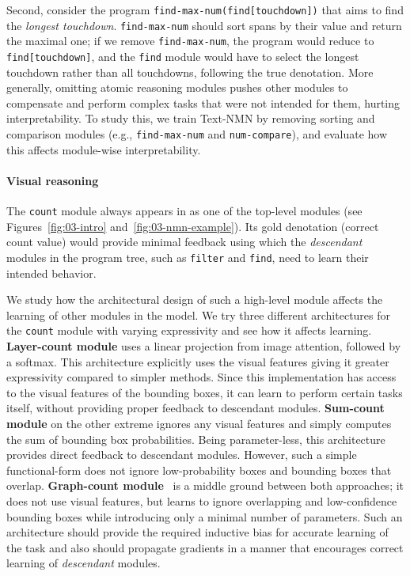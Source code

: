 \documentclass[main.tex]{subfiles}
\begin{document}
Second, consider the program \texttt{find-max-num(find[\textrm{touchdown}])} that aims to find the \textit{longest touchdown}.
\texttt{find-max-num} should sort spans by their value and return the maximal one; if we remove \texttt{find-max-num}, the program would reduce to \texttt{find[\textrm{touchdown}]},
and the \texttt{find} module would have to select the longest touchdown rather than all touchdowns, following the true denotation. More generally, omitting atomic reasoning modules pushes other modules to compensate and perform complex tasks that were not intended for them, hurting interpretability.
To study this, we train Text-NMN by removing sorting and comparison modules (e.g., \texttt{find-max-num} and \texttt{num-compare}), and evaluate how this affects module-wise interpretability.

\paragraph{Visual reasoning}
The \texttt{count} module always appears in \nlvr{} as one of the top-level modules (see Figures~\ref{fig:03-intro} and~\ref{fig:03-nmn-example}).
Its gold denotation (correct count value) would provide minimal feedback using which the \emph{descendant} modules in the program tree, such as \texttt{filter} and \texttt{find}, need to learn their intended behavior.

We study how the architectural design of such a high-level module affects the learning of other modules in the model. We try three different architectures for the \texttt{count} module with varying expressivity and see how it affects learning.
\textbf{Layer-count module} uses a linear projection from image attention, followed by a \textrm{softmax}. This architecture explicitly uses the visual features giving it greater expressivity compared to simpler methods. Since this implementation has access to the visual features of the bounding boxes, it can learn to perform certain tasks itself, without providing proper feedback to descendant modules.
\textbf{Sum-count module} on the other extreme ignores any visual features and simply computes the sum of bounding box probabilities. Being parameter-less, this architecture provides direct feedback to descendant modules. However, such a simple functional-form does not ignore low-probability boxes and bounding boxes that overlap.
\textbf{Graph-count module}~\cite{zhang-count-2018} is a middle ground between both approaches; it does not use visual features, but learns to ignore overlapping and low-confidence bounding boxes while introducing only a minimal number of parameters. Such an architecture should provide the required inductive bias for accurate learning of the task and also should propagate gradients in a manner that encourages correct learning of \emph{descendant} modules.
\end{document}
